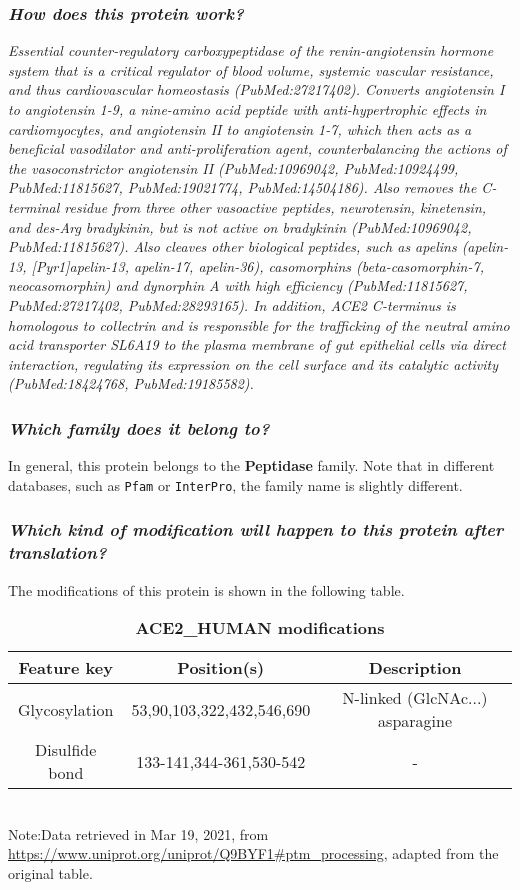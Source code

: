 \documentclass[en,black,11pt,normal]{elegantnote}
\begin{document}
\subsubsection{\textit{How does this protein work?}}
\textit{
Essential counter-regulatory carboxypeptidase of the renin-angiotensin hormone system that is a critical regulator of blood volume, systemic vascular resistance, and thus cardiovascular homeostasis (PubMed:27217402).
Converts angiotensin I to angiotensin 1-9, a nine-amino acid peptide with anti-hypertrophic effects in cardiomyocytes, and angiotensin II to angiotensin 1-7, which then acts as a beneficial vasodilator and anti-proliferation agent, counterbalancing the actions of the vasoconstrictor angiotensin II (PubMed:10969042, PubMed:10924499, PubMed:11815627, PubMed:19021774, PubMed:14504186). 
Also removes the C-terminal residue from three other vasoactive peptides, neurotensin, kinetensin, and des-Arg bradykinin, but is not active on bradykinin (PubMed:10969042, PubMed:11815627). Also cleaves other biological peptides, such as apelins (apelin-13, [Pyr1]apelin-13, apelin-17, apelin-36), casomorphins (beta-casomorphin-7, neocasomorphin) and dynorphin A with high efficiency (PubMed:11815627, PubMed:27217402, PubMed:28293165). In addition, ACE2 C-terminus is homologous to collectrin and is responsible for the trafficking of the neutral amino acid transporter SL6A19 to the plasma membrane of gut epithelial cells via direct interaction, regulating its expression on the cell surface and its catalytic activity (PubMed:18424768, PubMed:19185582).}

\subsubsection{\textit{Which family does it belong to?}}
In general, this protein belongs to the \textbf{Peptidase} family. Note that in different databases, such as \texttt{Pfam} or \texttt{InterPro},
the family name is slightly different.

\subsubsection{\textit{Which kind of modification will happen to this protein after translation?}}
The modifications of this protein is shown in the following table.

\begin{table}[H]
    \caption{\textbf{ACE2\_HUMAN modifications}}
    \centering
    \begin{tabular}{ccc}
        \toprule
        Feature key&Position(s)&Description\\
        \midrule
        Glycosylation&53,90,103,322,432,546,690&N-linked (GlcNAc...) asparagine\\
        Disulfide bond&133-141,344-361,530-542&-\\
        \bottomrule
    \end{tabular}
    \\\tiny{Note:Data retrieved in Mar 19, 2021, from \url{https://www.uniprot.org/uniprot/Q9BYF1#ptm_processing}, adapted from the original table.}
\end{table}
\end{document}
